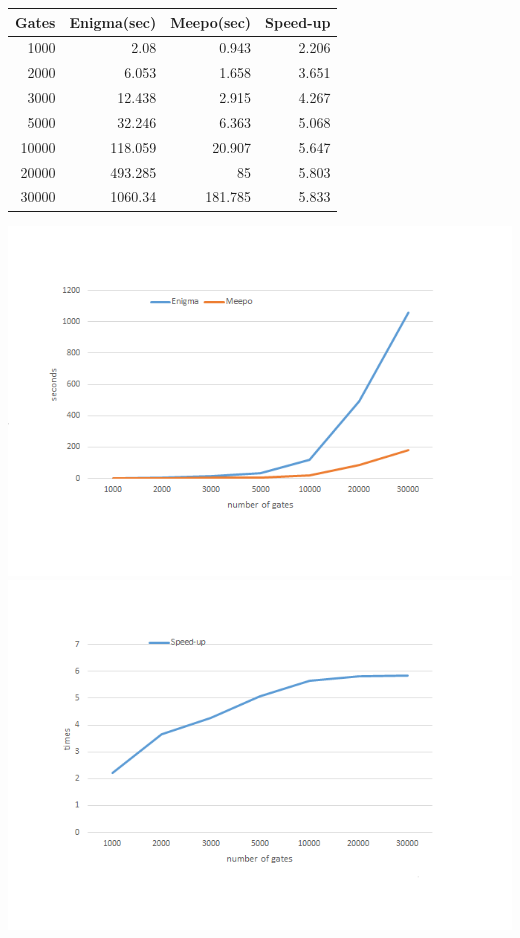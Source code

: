 \documentclass[a4paper,onesided,12pt]{report}
\begin{document}
\begin{center}
 \begin{tabular}{| r | r | r | r |}

\hline                        
Gates & Enigma(sec) & Meepo(sec) & Speed-up \\ \hline 
1000 & 2.08 & 0.943 & 2.206 \\ \hline
2000 & 6.053 & 1.658  & 3.651 \\ \hline
3000 & 12.438 & 2.915 & 4.267 \\ \hline
5000 & 32.246 & 6.363  & 5.068 \\ \hline
10000 & 118.059 & 20.907 & 5.647 \\ \hline
20000 & 493.285 & 85  & 5.803 \\ \hline
30000 & 1060.34 & 181.785  & 5.833 \\ \hline
\end{tabular} 


\includegraphics[height=0.45\textheight]{graph1.png} 
\includegraphics[height=0.45\textheight]{graph2.png} 
\end{center}
\end{document}
